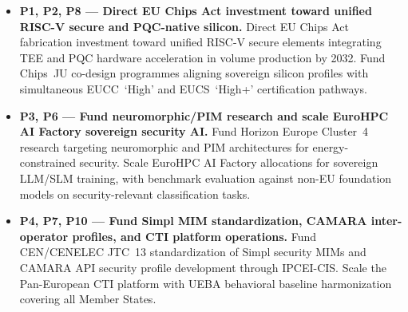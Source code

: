 \begin{itemize}

    \item \textbf{P1, P2, P8 --- Direct EU Chips Act investment toward
    unified RISC-V secure and PQC-native silicon.}
    Direct EU Chips Act fabrication investment toward unified RISC-V
    secure elements integrating TEE and PQC hardware acceleration in
    volume production by 2032. Fund Chips~JU co-design programmes
    aligning sovereign silicon profiles with simultaneous EUCC~`High'
    and EUCS~`High+' certification pathways.

    \item \textbf{P3, P6 --- Fund neuromorphic/PIM research and scale
    EuroHPC AI Factory sovereign security AI.}
    Fund Horizon Europe Cluster~4 research targeting neuromorphic and
    PIM architectures for energy-constrained security. Scale EuroHPC
    AI Factory allocations for sovereign LLM/SLM training, with
    benchmark evaluation against non-EU foundation models on
    security-relevant classification tasks.

    \item \textbf{P4, P7, P10 --- Fund Simpl MIM standardization,
    CAMARA inter-operator profiles, and CTI platform operations.}
    Fund CEN/CENELEC JTC~13 standardization of Simpl security MIMs
    and CAMARA API security profile development through IPCEI-CIS.
    Scale the Pan-European CTI platform with UEBA behavioral baseline
    harmonization covering all Member States.

\end{itemize}

